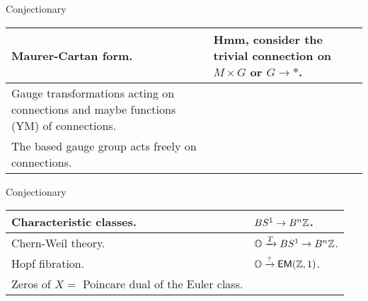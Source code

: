 \documentclass[13pt,aspectratio=169,hyperref={hypertexnames = false},handout]{beamer}
\begin{document}
\begin{frame}{Conjectionary}
\begin{tabular}{p{17em}|p{17em}}
\hline
Maurer-Cartan form. & Hmm, consider the trivial connection on \( M\times G \) or \( G\to * \).\\ \hline
Gauge transformations acting on connections and maybe functions (YM) of connections. & \\ \hline
The based gauge group acts freely on connections. & \\ \hline
\end{tabular}
\end{frame}

\begin{frame}{Conjectionary}
\begin{tabular}{p{17em}|p{17em}}
\hline
Characteristic classes. & \( BS^1\to B^n\mathbb{Z} \).\\ \hline
Chern-Weil theory. & \( \mathbb{O}\xrightarrow[]{T}BS^1\to B^n\mathbb{Z} \). \\ \hline
Hopf fibration. & \( \mathbb{O}\xrightarrow[]{?}\mathsf{EM}(\mathbb{Z},1) \).  \\ \hline
Zeros of \( X = \) Poincare dual of the Euler class. & \\ \hline
\end{tabular}
\end{frame}
\end{document}
